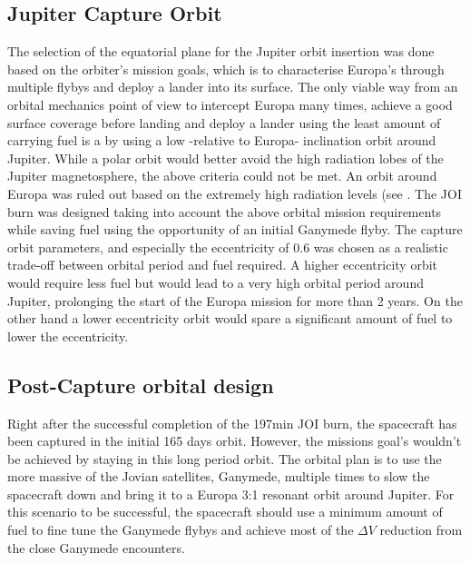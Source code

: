 \subsection{Jupiter Capture Orbit}
 The selection of the equatorial plane for the Jupiter orbit insertion was done based on the orbiter's mission goals, which is to characterise Europa’s through multiple flybys and deploy a lander into its surface. The only viable way from an orbital mechanics point of view to intercept Europa many times, achieve a good surface coverage before landing and deploy a lander using the least amount of carrying fuel is a by using a low -relative to Europa- inclination orbit around Jupiter. While a polar orbit would better avoid the high radiation lobes of the Jupiter magnetosphere, the above criteria could not be met. An orbit around Europa was ruled out based on the extremely high radiation levels (see . The JOI burn was designed taking into account the above orbital mission requirements while saving fuel using the opportunity of an initial Ganymede flyby. The capture orbit parameters, and especially the eccentricity of 0.6 was chosen as a realistic trade-off between orbital period and fuel required. A higher eccentricity orbit would require less fuel but would lead to a very high orbital period around Jupiter, prolonging the start of the Europa mission for more than 2 years. On the other hand a lower eccentricity orbit would spare a significant amount of fuel to lower the eccentricity.
\subsection{Post-Capture orbital design}
Right after the successful completion of the 197min JOI burn, the spacecraft has been captured in the initial 165 days orbit. However, the missions goal's wouldn't be achieved by staying in this long period orbit. The orbital plan is to use the more massive of the Jovian satellites, Ganymede, multiple times to slow the spacecraft down and bring it to a Europa 3:1 resonant orbit around Jupiter. For this scenario to be successful, the spacecraft should use a minimum amount of fuel to fine tune the Ganymede flybys and achieve most of the $\Delta V$ reduction from the close Ganymede encounters. 

